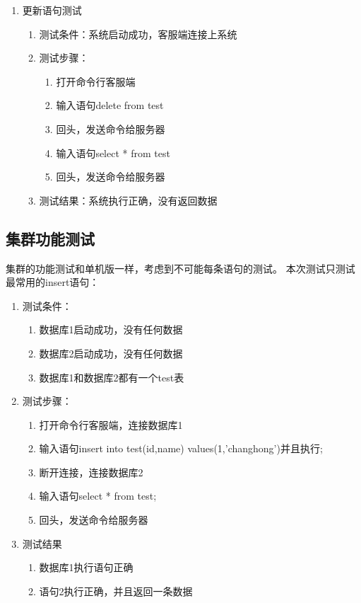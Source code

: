 \begin{enumerate}
\item 更新语句测试
\begin{enumerate}
	\item 测试条件：系统启动成功，客服端连接上系统
	\item 测试步骤：
	\begin{enumerate}
		\item 打开命令行客服端
		\item 输入语句delete from test
		\item 回头，发送命令给服务器
		\item 输入语句select * from test
		\item 回头，发送命令给服务器
	\end{enumerate}
	\item 	测试结果：系统执行正确，没有返回数据
\end{enumerate}	


\end{enumerate}	
\subsection{集群功能测试}
集群的功能测试和单机版一样，考虑到不可能每条语句的测试。
本次测试只测试最常用的insert语句：
\begin{enumerate}
	\item 测试条件：
	\begin{enumerate}
		\item 数据库1启动成功，没有任何数据
		\item 数据库2启动成功，没有任何数据
		\item 数据库1和数据库2都有一个test表
	\end{enumerate}
	\item 测试步骤：
	\begin{enumerate}
		\item 打开命令行客服端，连接数据库1
		\item 输入语句insert into test(id,name) values(1,'changhong')并且执行;
		\item 断开连接，连接数据库2
		\item 输入语句select * from test;
		\item 回头，发送命令给服务器
	\end{enumerate}
	\item 	测试结果
	\begin{enumerate}
		\item 数据库1执行语句正确
		\item 语句2执行正确，并且返回一条数据
	\end{enumerate}
\end{enumerate}	
